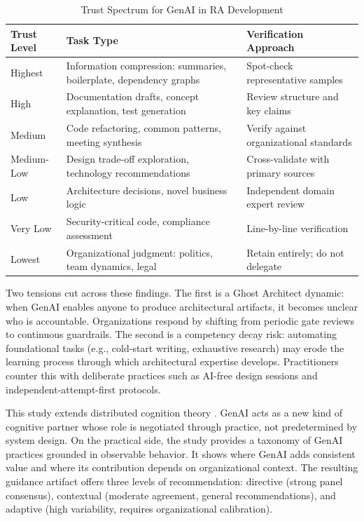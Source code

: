 \begin{table}[!ht]
    \centering
    \caption{Trust Spectrum for GenAI in RA Development}\label{tab:trust-spectrum-es}
    \begin{tabular}{|p{2.5cm}|p{5.5cm}|p{5.5cm}|}
        \hline
        \textbf{Trust Level} & \textbf{Task Type} & \textbf{Verification Approach} \\
        \hline
        Highest & Information compression: summaries, boilerplate, dependency graphs & Spot-check representative samples \\
        \hline
        High & Documentation drafts, concept explanation, test generation & Review structure and key claims \\
        \hline
        Medium & Code refactoring, common patterns, meeting synthesis & Verify against organizational standards \\
        \hline
        Medium-Low & Design trade-off exploration, technology recommendations & Cross-validate with primary sources \\
        \hline
        Low & Architecture decisions, novel business logic & Independent domain expert review \\
        \hline
        Very Low & Security-critical code, compliance assessment & Line-by-line verification \\
        \hline
        Lowest & Organizational judgment: politics, team dynamics, legal & Retain entirely; do not delegate \\
        \hline
    \end{tabular}
\end{table}

Two tensions cut across these findings. The first is a Ghost Architect dynamic:
when GenAI enables anyone to produce architectural artifacts, it becomes unclear
who is accountable. Organizations respond by shifting from periodic gate reviews
to continuous guardrails. The second is a competency decay risk: automating
foundational tasks (e.g., cold-start writing, exhaustive research) may erode the
learning process through which architectural expertise develops. Practitioners
counter this with deliberate practices such as AI-free design sessions and
independent-attempt-first protocols.

This study extends distributed cognition theory
\parencite{hutchins_cognition_1995}. GenAI acts as a new kind of cognitive
partner whose role is negotiated through practice, not predetermined by system
design. On the practical side, the study provides a taxonomy of GenAI practices
grounded in observable behavior. It shows where GenAI adds consistent value and
where its contribution depends on organizational context. The resulting guidance
artifact offers three levels of recommendation: directive (strong panel
consensus), contextual (moderate agreement, general recommendations), and
adaptive (high variability, requires organizational calibration).

